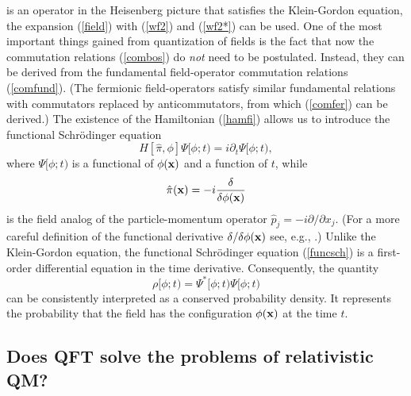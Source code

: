 \documentclass[12pt]{article}
\begin{document}
is an operator in the Heisenberg picture that satisfies the 
Klein-Gordon equation, the expansion (\ref{field}) with 
(\ref{wf2}) and (\ref{wf2*}) can be used. One of the most important 
things gained from quantization of fields is the fact that 
now the commutation relations (\ref{combos}) do {\em not} need
to be postulated. Instead, they can be derived from 
the fundamental field-operator commutation relations 
(\ref{comfund}). (The fermionic field-operators satisfy similar 
fundamental relations with commutators
replaced by anticommutators, from which 
(\ref{comfer}) can be derived.)
The existence of the Hamiltonian (\ref{hamfi}) allows us 
to introduce the functional Schr\"odinger equation
\begin{equation}\label{funcsch}
H[\hat{\pi},\phi] \Psi[\phi;t)=i\partial_t \Psi[\phi;t) ,
\end{equation}
where
$\Psi[\phi;t)$ is a functional of $\phi({\bf x})$ and a function of 
$t$, while 
\begin{equation}
\hat{\pi}({\bf x}) = -i\frac{\delta}{\delta\phi({\bf x})}
\end{equation}
is the field analog of the particle-momentum operator
$\hat{p}_j=-i\partial/\partial x_j$. 
(For a more careful definition of the functional 
derivative $\delta/\delta\phi({\bf x})$ see, e.g., \cite{ryder}.)
Unlike the Klein-Gordon equation, the functional 
Schr\"odinger equation (\ref{funcsch}) is a first-order differential 
equation in the time derivative. Consequently, the quantity
\begin{equation}\label{rhofi}
\rho[\phi;t)=\Psi^*[\phi;t)\Psi[\phi;t) 
\end{equation}
can be consistently interpreted as a conserved probability density.
It represents the probability that the field has the 
configuration $\phi({\bf x})$ at the time $t$.

\subsection{Does QFT solve the problems of relativistic QM?}
\end{document}
